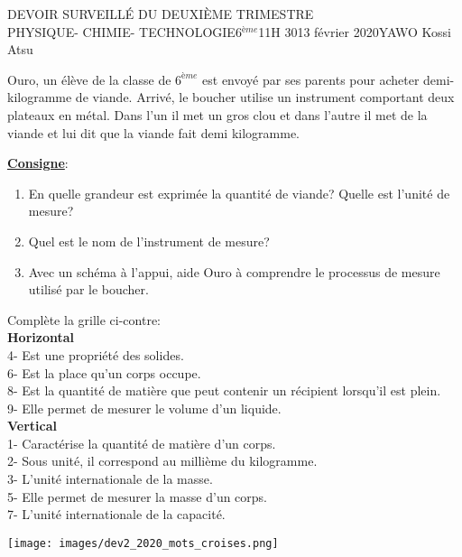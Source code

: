 \documentclass[12pt,a4paper]{book}
\newcommand{\prof}{YAWO Kossi Atsu}
\newcommand{\matiere}{\\PHYSIQUE- CHIMIE- TECHNOLOGIE}
\newcommand{\classe}{6$^{ème}$}
\begin{document}
\begin{devoir}{DEVOIR SURVEILLÉ DU DEUXIÈME TRIMESTRE}{\matiere}{\classe}{1}{1H 30}{13 février 2020}{\prof}
\begin{exo}[8]
Ouro, un élève de la classe de $6^{ème}$ est envoyé par ses parents pour acheter demi-kilogramme de viande. Arrivé, le boucher utilise un instrument comportant deux plateaux en métal. Dans l'un il met un gros clou et dans l'autre il met de la viande et lui dit que la viande fait demi kilogramme.

\textbf{\underline{Consigne}}:
\begin{enumerate}
\item En quelle grandeur est exprimée la quantité de viande? Quelle est l'unité de mesure?
\item Quel est le nom de l'instrument de mesure?
\item Avec un schéma à l'appui, aide Ouro à comprendre le processus de mesure utilisé par le boucher.
\end{enumerate}
\end{exo}

\vspace{0.5cm}
\begin{exo}[4,5]
\begin{multicols}{2}
Complète la grille ci-contre:\\
\textbf{Horizontal}\\
4- Est une propriété des solides.\\
6- Est la place qu'un corps occupe.\\
8- Est la quantité de matière que peut contenir un récipient lorsqu'il est plein.\\
9- Elle permet de mesurer le volume d'un liquide.\\


\textbf{Vertical}\\
1- Caractérise la quantité de matière d'un corps.\\
2- Sous unité, il correspond au millième du kilogramme.\\
3- L'unité internationale de la masse.\\
5- Elle permet de mesurer la masse d'un corps.\\
7- L'unité internationale de la capacité.\\
\vspace{1cm}
\begin{center}
\texttt{[image: images/dev2\_2020\_mots\_croises.png]}
\end{center}


\end{multicols}
\end{exo}
\end{devoir}
\end{document}
